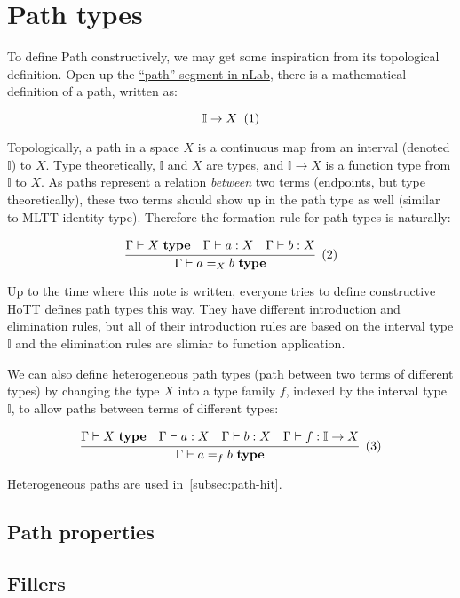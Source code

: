 \section{Path types}
\label{sec:path}

To define Path constructively,
we may get some inspiration from its topological definition.
Open-up the \href{https://ncatlab.org/nlab/show/path}{``path'' segment in nLab},
there is a mathematical definition of a path, written as:

\[
  \mathbb I \rightarrow X
  \xtag
\]

Topologically, a path in a space $X$ is a continuous map
from an interval (denoted $\mathbb I$) to $X$.
Type theoretically, $\mathbb I$ and $X$ are types,
and $\mathbb I \rightarrow X$ is a function type from $\mathbb I$ to $X$.
As paths represent a relation \textit{between} two terms
(endpoints, but type theoretically),
these two terms should show up in the path type as well
(similar to MLTT identity type).
Therefore the formation rule for path types is naturally:

\[
  \cfrac{
    \Gamma \vdash X \ \textbf{type}
    \quad
    \Gamma \vdash a : X
    \quad
    \Gamma \vdash b : X
  }{\Gamma \vdash a =_X b \ \textbf{type}}
  \xtag
\]

Up to the time where this note is written,
everyone tries to define constructive HoTT defines path types this way.
They have different introduction and elimination rules,
but all of their introduction rules are
based on the interval type $\mathbb I$
and the elimination rules are slimiar to function application.

We can also define heterogeneous path types
(path between two terms of different types)
by changing the type $X$ into a type family $f$,
indexed by the interval type $\mathbb I$,
to allow paths between terms of different types:

\[
  \cfrac{
    \Gamma \vdash X \ \textbf{type}
    \quad
    \Gamma \vdash a : X
    \quad
    \Gamma \vdash b : X
    \quad
    \Gamma \vdash f : \mathbb I \rightarrow X
  }{\Gamma \vdash a =_f b \ \textbf{type}}
  \xtag \label{eqn:hetero-path}
\]

Heterogeneous paths are used in~\cref{subsec:path-hit}.



\subsection{Path properties}
\label{subsec:path-prop}




\subsection{Fillers}
\label{subsec:fill}

\TODO
